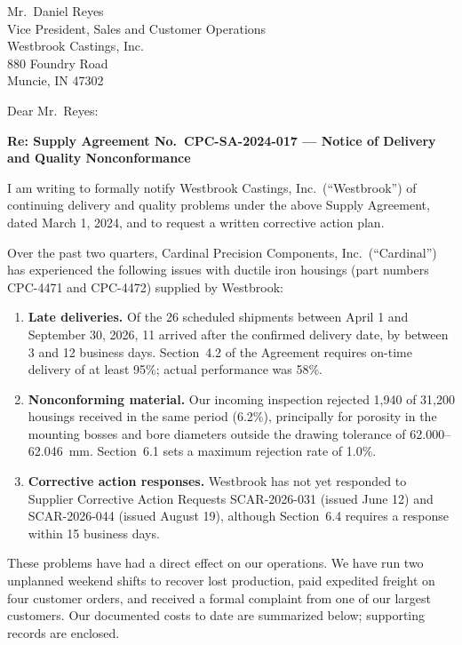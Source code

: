 \documentclass[11pt]{letter}
\date{October 7, 2026}
\begin{document}
\begin{letter}{Mr.\ Daniel Reyes\\
               Vice President, Sales and Customer Operations\\
               Westbrook Castings, Inc.\\
               880 Foundry Road\\
               Muncie, IN 47302}

\opening{Dear Mr.\ Reyes:}

\textbf{Re: Supply Agreement No.\ CPC-SA-2024-017 --- Notice of Delivery and Quality Nonconformance}

I am writing to formally notify Westbrook Castings, Inc.\ (``Westbrook'') of continuing delivery and quality problems under the above Supply Agreement, dated March 1, 2024, and to request a written corrective action plan.

Over the past two quarters, Cardinal Precision Components, Inc.\ (``Cardinal'') has experienced the following issues with ductile iron housings (part numbers CPC-4471 and CPC-4472) supplied by Westbrook:

\begin{enumerate}[leftmargin=*, itemsep=2pt]
  \item \textbf{Late deliveries.} Of the 26 scheduled shipments between April 1 and September 30, 2026, 11 arrived after the confirmed delivery date, by between 3 and 12 business days. Section~4.2 of the Agreement requires on-time delivery of at least 95\%; actual performance was 58\%.
  \item \textbf{Nonconforming material.} Our incoming inspection rejected 1,940 of 31,200 housings received in the same period (6.2\%), principally for porosity in the mounting bosses and bore diameters outside the drawing tolerance of 62.000--62.046~mm. Section~6.1 sets a maximum rejection rate of 1.0\%.
  \item \textbf{Corrective action responses.} Westbrook has not yet responded to Supplier Corrective Action Requests SCAR-2026-031 (issued June 12) and SCAR-2026-044 (issued August 19), although Section~6.4 requires a response within 15 business days.
\end{enumerate}

These problems have had a direct effect on our operations. We have run two unplanned weekend shifts to recover lost production, paid expedited freight on four customer orders, and received a formal complaint from one of our largest customers. Our documented costs to date are summarized below; supporting records are enclosed.


\end{letter}
\end{document}
